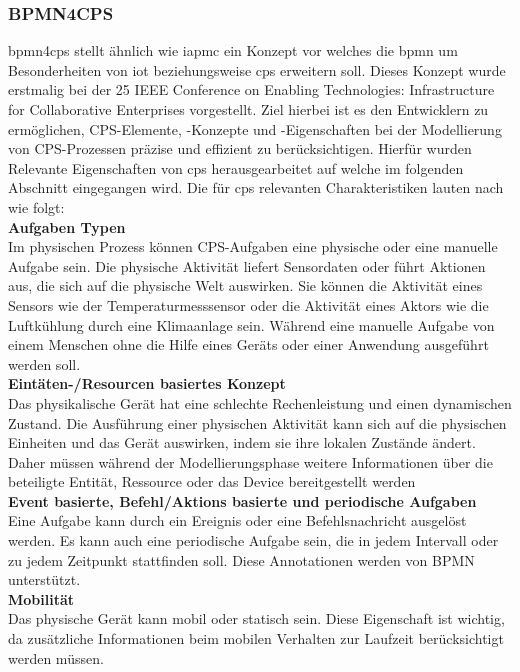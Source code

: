\documentclass[a4paper, 12pt, twoside, headsepline=true]{scrartcl} %
\begin{document}
\subsubsection{BPMN4CPS}
\ac{bpmn4cps} stellt ähnlich wie \ac{iapmc} ein Konzept vor welches die \ac{bpmn} um Besonderheiten von \ac{iot} beziehungsweise \ac{cps} erweitern soll. Dieses Konzept wurde erstmalig bei der 25 IEEE Conference on Enabling Technologies: Infrastructure for Collaborative Enterprises vorgestellt. Ziel hierbei ist es den Entwicklern zu ermöglichen, CPS-Elemente, -Konzepte und -Eigenschaften bei der Modellierung von CPS-Prozessen präzise und effizient zu berücksichtigen. Hierfür wurden Relevante Eigenschaften von \ac{cps} herausgearbeitet auf welche im folgenden Abschnitt eingegangen wird.
Die für \ac{cps} relevanten Charakteristiken lauten nach \cite{BMPN4CPS} wie folgt:\\

\textbf{Aufgaben Typen}\\
Im physischen Prozess können CPS-Aufgaben eine physische oder eine manuelle Aufgabe sein. Die physische Aktivität liefert Sensordaten oder führt Aktionen aus, die sich auf die physische Welt auswirken. Sie können die Aktivität eines Sensors wie der Temperaturmesssensor oder die Aktivität eines Aktors wie die Luftkühlung durch eine Klimaanlage sein. Während eine manuelle Aufgabe von einem Menschen ohne die Hilfe eines Geräts oder einer Anwendung ausgeführt werden soll.\\

\textbf{Eintäten-/Resourcen basiertes Konzept}\\
Das physikalische Gerät hat eine schlechte Rechenleistung und einen dynamischen Zustand. Die Ausführung einer physischen Aktivität kann sich auf die physischen Einheiten und das Gerät auswirken, indem sie ihre lokalen Zustände ändert. Daher müssen während der Modellierungsphase weitere Informationen über die beteiligte Entität, Ressource oder das Device bereitgestellt werden\\

\textbf{Event basierte, Befehl/Aktions basierte und periodische Aufgaben}\\
Eine Aufgabe kann durch ein Ereignis oder eine Befehlsnachricht ausgelöst werden. Es kann auch eine periodische Aufgabe sein, die in jedem Intervall oder zu jedem Zeitpunkt stattfinden soll. Diese Annotationen werden von BPMN unterstützt.\\

\textbf{Mobilität}\\
Das physische Gerät kann mobil oder statisch sein. Diese Eigenschaft ist wichtig, da zusätzliche Informationen beim mobilen Verhalten zur Laufzeit berücksichtigt werden müssen.\\
\end{document}
